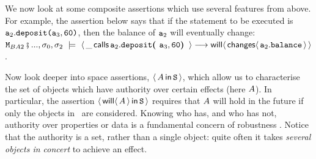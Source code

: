 %
%
%
%

 We now look at some composite assertions which use  
 several features from above. For example, the assertion below 
says that if the statement to be executed is   ${{\mbox{\tt{a}}}}_2.{\mbox{\tt{deposit}}}{\mbox{\tt{(}}}{{\mbox{\tt{a}}}}_3,{\mbox{\tt{60}}}{\mbox{\tt{)}}}$,
then the balance of ${{\mbox{\tt{a}}}}_2$ will eventually change:\\

\vspace*{-1mm}
\noindent $\M_{BA2}\mkpair ..., \sigma_0,\sigma_2 \ \models \ {\Calls {\_}   {\prg{deposit}} {\acc_2} {\acc_3,\prg{60}} } \longrightarrow {\Future{ \Changes {\acc_2.\bal}}}$.

\vspace{.2cm}
 
Now look deeper into space assertions, $\langle\, A\, \mathsf{in}\, {{\mbox{\tt{S}}}}\, \rangle$, which
allow us to characterise the set of objects which have authority over
certain effects (here $A$). In particular,  the assertion   $\langle\, {\mathsf{will}}\langle \,A\,\rangle\, \mathsf{in}\, {{\mbox{\tt{S}}}}\, \rangle$  requires that $A$ will hold in
the future if only the objects in \SF\ are considered.
Knowing who has, and who has not, authority over properties or data is a fundamental concern of robustness
\cite{MillerPhD}. Notice that the authority is a set, rather than a single object: quite often it takes \emph{several objects in concert}
 to achieve an effect.


